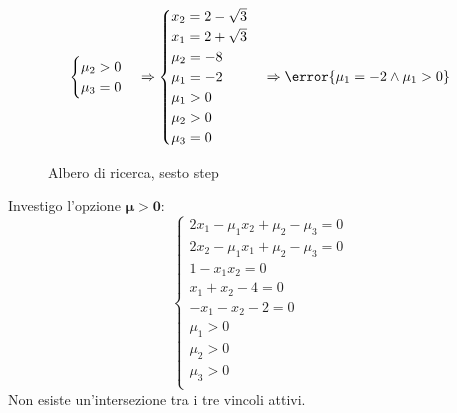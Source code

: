 \documentclass[\main/main.tex]{subfiles}
\begin{document}
\[\begin{cases}
    \mu_2 > 0                               \\
    \mu_3 = 0                               \\
  \end{cases}
  \Rightarrow
  \begin{cases}
    x_2 = 2-\sqrt{3} \\
    x_1 = 2+\sqrt{3} \\
    \mu_2 = -8       \\
    \mu_1 = -2       \\
    \mu_1 > 0        \\
    \mu_2 > 0        \\
    \mu_3 = 0        \\
  \end{cases}
  \Rightarrow
  \error{\mu_1 = -2 \land \mu_1>0}
\]
\begin{figure}
  \caption{Albero di ricerca, sesto step}
\end{figure}

Investigo l'opzione $\bm{\mu}>\bm{0}$:
\[
  \begin{cases}
    2x_1-\mu_1x_2 + \mu_2 - \mu_3 = 0 \\
    2x_2-\mu_1x_1 + \mu_2 - \mu_3 = 0 \\
    1-x_1x_2 = 0                      \\
    x_1 + x_2 -4 = 0                  \\
    -x_1 - x_2 - 2 = 0                \\
    \mu_1 > 0                         \\
    \mu_2 > 0                         \\
    \mu_3 > 0                         \\
  \end{cases}
\]
Non esiste un'intersezione tra i tre vincoli attivi.
\end{document}
